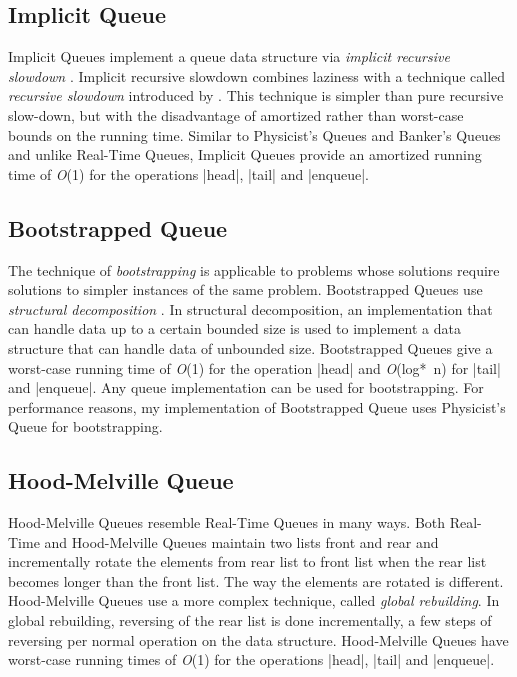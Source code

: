 \subsection*{Implicit Queue}
Implicit Queues implement a queue data structure via \emph{implicit
recursive slowdown} \citep{oka}. Implicit recursive slowdown combines
laziness with a technique called \emph{recursive slowdown} introduced by
\cite{kaplan-tarjan}. This technique is simpler than pure recursive
slow-down, but with the disadvantage of amortized rather than worst-case
bounds on the running time. Similar to Physicist's Queues and Banker's
Queues and unlike Real-Time Queues, Implicit Queues provide an amortized
running time of \emph{O}(1) for the operations \scheme|head|,
\scheme|tail| and \scheme|enqueue|.


\subsection*{Bootstrapped Queue}
The technique of \emph{bootstrapping} is applicable to problems whose
solutions require solutions to simpler instances of the same
problem. Bootstrapped Queues use \emph{structural decomposition}
\citep{oka}.  In structural decomposition, an implementation that can
handle data up to a certain bounded size is used to implement a data
structure that can handle data of unbounded size. Bootstrapped Queues
give a worst-case running time of \emph{O}(1) for the operation
\scheme|head| and \emph{O}(log*~n) for \scheme|tail| and \scheme|enqueue|.
Any queue implementation can be used for bootstrapping. For performance
reasons, my implementation of Bootstrapped Queue uses Physicist's Queue
for bootstrapping.


\subsection*{Hood-Melville Queue}
Hood-Melville Queues \citep{hood-mel} resemble Real-Time Queues in many
ways. Both Real-Time and Hood-Melville Queues maintain two lists front
and rear and incrementally rotate the elements from rear list to front
list when the rear list becomes longer than the front list. The way the
elements are rotated is different. Hood-Melville Queues use a more
complex technique, called \emph{global rebuilding}. In global
rebuilding, reversing of the rear list is done incrementally, a few
steps of reversing per normal operation on the data
structure. Hood-Melville Queues have worst-case running times of
\emph{O}(1) for the operations \scheme|head|, \scheme|tail| and
\scheme|enqueue|.

